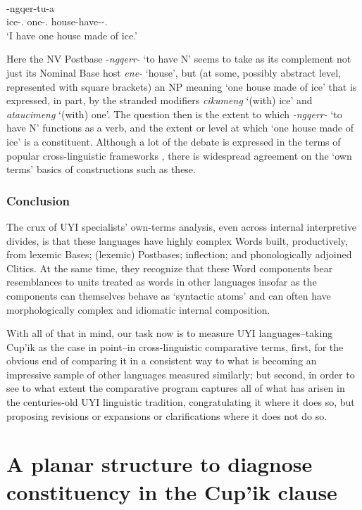 \documentclass[output=paper]{langscibook}
\begin{document}
\ea\label{ex:key:20}
{\citep[352]{Woodbury2017}}\\
-ngqer-tu-a\\
     ice-\Ins.\Sg{} one-\Ins.\Sg{} house-have-\Ind{}-\Tsg.\Sarg{}\\
\glt `I have one house made of ice.'
\z

Here the NV Postbase -\textit{ngqerr-} `to have N' seems to take as its complement not just its Nominal Base host \textit{ene-} `house', but (at some, possibly abstract level, represented with square brackets) an NP meaning `one house made of ice' that is expressed, in part, by the stranded modifiers \textit{cikumeng} `(with) ice' and \textit{ataucimeng} `(with) one'. The question then is the extent to which \textit{{}-ngqerr-} `to have N' functions as a verb, and the extent or level at which `one house made of ice' is a constituent. Although a lot of the debate is expressed in the terms of popular cross-linguistic frameworks \citep{haspelmathword:2011}, there is widespread agreement on the `own terms' basics of constructions such as these.

\subsubsection{Conclusion} \label{sec:3.4.4}

The crux of UYI specialists' own-terms analysis, even across internal interpretive divides, is that these languages have highly complex Words built, productively, from lexemic Bases; (lexemic) Postbases; inflection; and phonologically adjoined Clitics. At the same time, they recognize that these Word components bear resemblances to units treated as words in other languages insofar as the components can themselves behave as `syntactic atoms' and can often have morphologically complex and idiomatic internal composition.

With all of that in mind, our task now is to measure UYI languages--taking Cup'ik as the case in point--in cross-linguistic comparative terms, first, for the obvious end of comparing it in a consistent way to what is becoming an impressive sample of other languages measured similarly; but second, in order to see to what extent the comparative program captures all of what has arisen in the centuries-old UYI linguistic tradition, congratulating it where it does so, but proposing revisions or expansions or clarifications where it does not do so.

\section{A planar structure to diagnose constituency in the Cup'ik clause} \label{sec:4}
\end{document}
